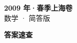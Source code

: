 \documentclass[zihao=-4, a4paper]{ctexart}
\begin{document}
\begin{center}
  {\Large\bfseries 2009 年·春季上海卷}\\[4pt]
  {\large 数学 · 简答版}
\end{center}
\medskip
{}

\clearpage
{}
\begin{center}{\Large\bfseries 答案速查}\end{center}
\medskip

\end{document}
